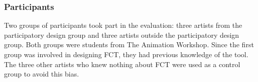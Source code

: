 \subsubsection{Participants}
Two groups of participants took part in the evaluation: three artists from the participatory design group and three artists outside the participatory design group. Both groups were students from The Animation Workshop. Since the first group was involved in designing FCT, they had previous knowledge of the tool. The three other artists who knew nothing about FCT were used as a control group to avoid this bias.